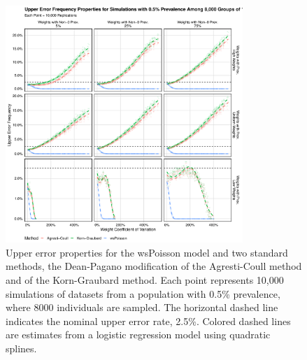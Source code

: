 \begin{figure}
\centering
\includegraphics[width=0.8\textwidth]{perfect_upper_error_frequency_8000_groups_0_005_prev}
\caption{Upper error properties for the wsPoisson model and two standard methods, the Dean-Pagano modification of the Agresti-Coull method and of the Korn-Graubard method.
Each point represents 10,000 simulations of datasets from a population with 0.5\% prevalence, where 8000 individuals are sampled.
The horizontal dashed line indicates the nominal upper error rate, 2.5\%.
Colored dashed lines are estimates from a logistic regression model using quadratic splines.}
\label{ch_3:fig:perfect_upper_error_frequency_8000_groups_0_005_prev}
\end{figure}

